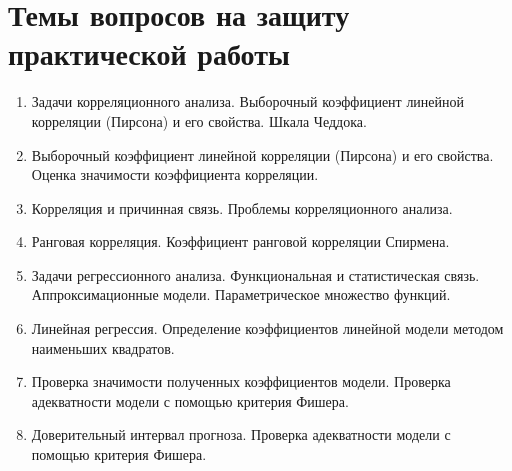\documentclass[
]{article}
\providecommand{\tightlist}{%
  \setlength{\itemsep}{0pt}\setlength{\parskip}{0pt}}
\begin{document}
\hypertarget{ux442ux435ux43cux44b-ux432ux43eux43fux440ux43eux441ux43eux432-ux43dux430-ux437ux430ux449ux438ux442ux443-ux43fux440ux430ux43aux442ux438ux447ux435ux441ux43aux43eux439-ux440ux430ux431ux43eux442ux44b}{%
\section{\texorpdfstring{\textbf{Темы вопросов на защиту практической
работы}}{Темы вопросов на защиту практической работы}}\label{ux442ux435ux43cux44b-ux432ux43eux43fux440ux43eux441ux43eux432-ux43dux430-ux437ux430ux449ux438ux442ux443-ux43fux440ux430ux43aux442ux438ux447ux435ux441ux43aux43eux439-ux440ux430ux431ux43eux442ux44b}}

\begin{enumerate}
\def\labelenumi{\arabic{enumi}.}
\tightlist
\item
  Задачи корреляционного анализа. Выборочный коэффициент линейной
  корреляции (Пирсона) и его свойства. Шкала Чеддока.
\item
  Выборочный коэффициент линейной корреляции (Пирсона) и его свойства.
  Оценка значимости коэффициента корреляции.
\item
  Корреляция и причинная связь. Проблемы корреляционного анализа.
\item
  Ранговая корреляция. Коэффициент ранговой корреляции Спирмена.
\item
  Задачи регрессионного анализа. Функциональная и статистическая связь.
  Аппроксимационные модели. Параметрическое множество функций.
\item
  Линейная регрессия. Определение коэффициентов линейной модели методом
  наименьших квадратов.
\item
  Проверка значимости полученных коэффициентов модели. Проверка
  адекватности модели с помощью критерия Фишера.
\item
  Доверительный интервал прогноза. Проверка адекватности модели с
  помощью критерия Фишера.
\end{enumerate}
\end{document}
